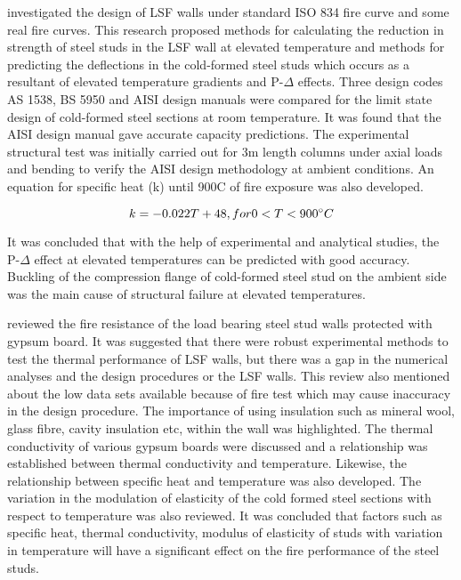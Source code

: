 \citet{Gerlich1996} investigated the design of LSF walls under standard ISO 834 fire curve and some real fire curves. This research proposed methods for calculating the reduction in strength of steel studs in the LSF wall at elevated temperature and methods for predicting the deflections in the cold-formed steel studs which occurs as a resultant of elevated temperature gradients and P-$\Delta$ effects. Three design codes AS 1538, BS 5950 and AISI design manuals were compared for the limit state design of cold-formed steel sections at room temperature. It was found that the AISI design manual gave accurate capacity predictions. The experimental structural test was initially carried out for 3m length columns under axial loads and bending to verify the AISI design methodology at ambient conditions. An equation for specific heat (k) until 900\degree C of fire exposure was also developed.

\begin{equation}
k = -0.022T + 48, for 0 < T < 900\degree C
\end{equation}

It was concluded that with the help of experimental and analytical studies, the P-$\Delta$ effect at elevated temperatures can be predicted with good accuracy. Buckling of the compression flange of cold-formed steel stud on the ambient side was the main cause of structural failure at elevated temperatures.

\citet{Alfawakhiri1999} reviewed the fire resistance of the load bearing steel stud walls protected with gypsum board. It was suggested that there were robust experimental methods to test the thermal performance of LSF walls, but there was a gap in the numerical analyses and the design procedures or the LSF walls. This review also mentioned about the low data sets available because of fire test which may cause inaccuracy in the design procedure. The importance of using insulation such as mineral wool, glass fibre, cavity insulation etc, within the wall was highlighted. The thermal conductivity of various gypsum boards were discussed and a relationship was established between thermal conductivity and temperature. Likewise, the relationship between specific heat and temperature was also developed. The variation in the modulation of elasticity of the cold formed steel sections with respect to temperature was also reviewed. It was concluded that factors such as specific heat, thermal conductivity, modulus of elasticity of studs with variation in temperature will have a significant effect on the fire performance of the steel studs.   

